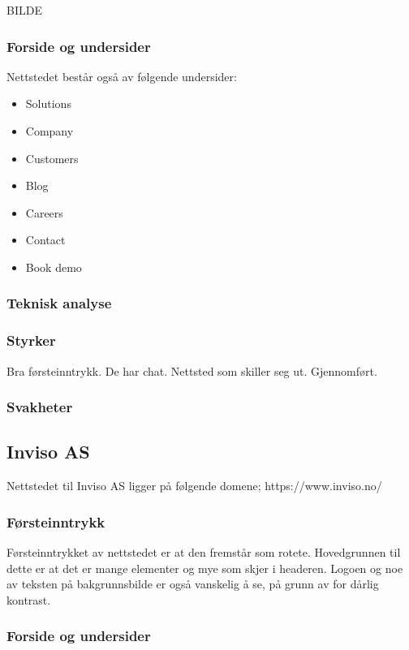 BILDE

\subsubsection{Forside og undersider}

Nettstedet består også av følgende undersider:
\begin{itemize}
\item Solutions
\item Company
\item Customers
\item Blog
\item Careers 
\item Contact
\item Book demo
\end{itemize}

\subsubsection{Teknisk analyse}

\subsubsection{Styrker}
Bra førsteinntrykk. De har chat. Nettsted som skiller seg ut. Gjennomført.

\subsubsection{Svakheter}



\subsection{Inviso AS}
Nettstedet til Inviso AS ligger på følgende domene;
https://www.inviso.no/

\subsubsection{Førsteinntrykk}
Førsteinntrykket av nettstedet er at den fremstår som rotete. Hovedgrunnen til dette er at det er mange elementer og mye som skjer i headeren. Logoen og noe av teksten på bakgrunnsbilde er også vanskelig å se, på grunn av for dårlig kontrast. 

\subsubsection{Forside og undersider}

